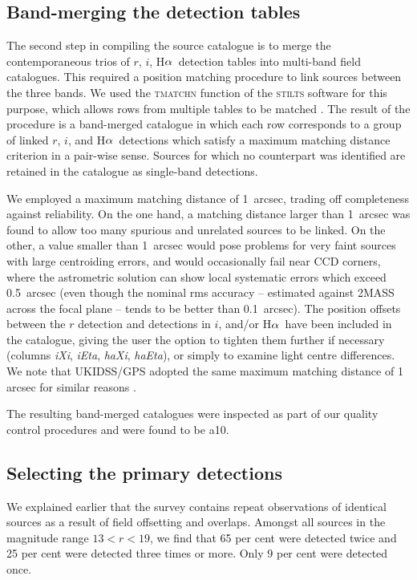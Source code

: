 \documentclass[a4paper,useAMS,usenatbib]{mn2e}
\def\ha{\mbox{H$\rm \alpha$}}
\begin{document}
\subsection{Band-merging the detection tables}

The second step in compiling the source catalogue
is to merge the contemporaneous trios
of $r$, $i$, \ha\ detection tables
into multi-band field catalogues.
This required a position matching procedure 
to link sources between the three bands.
We used the \textsc{tmatchn} function 
of the \textsc{stilts} software for this purpose,
which allows rows from multiple tables to be matched \citep{Taylor2006}.
The result of the procedure is a band-merged catalogue
in which each row corresponds to a group of linked $r$, $i$, and \ha\ detections
which satisfy a maximum matching distance criterion in a pair-wise sense.
Sources for which no counterpart was identified
are retained in the catalogue as single-band detections.

We employed a maximum matching distance of 1~arcsec, trading off completeness against reliability.
On the one hand, a matching distance larger than 1~arcsec 
was found to allow too many spurious and unrelated sources 
to be linked. 
On the other, a value smaller than 1~arcsec 
would pose problems for very faint sources 
with large centroiding errors, 
and would occasionally fail near CCD corners,
where the astrometric solution can 
show local systematic errors which exceed 0.5~arcsec
(even though the nominal rms accuracy
-- estimated against 2MASS across the focal plane --
tends to be better than 0.1~arcsec).
The position offsets between the $r$ detection and detections in $i$, and/or \ha\
have been included in the catalogue, giving the user the option to tighten them 
further if necessary
(columns \emph{iXi}, \emph{iEta}, \emph{haXi}, \emph{haEta}),
or simply to examine light centre differences.
We note that UKIDSS/GPS adopted 
the same maximum matching distance of 1 arcsec
for similar reasons \citep{Hambly2008}.

The resulting band-merged catalogues were inspected
as part of our quality control procedures
and were found to be a10.

\subsection{Selecting the primary detections}

We explained earlier that the survey contains repeat observations
of identical sources as a result of field offsetting and overlaps.
Amongst all sources in the magnitude range $13<r<19$,
we find that 65 per cent were detected twice
and 25 per cent were detected three times or more.
Only 9 per cent were detected once.
\end{document}
